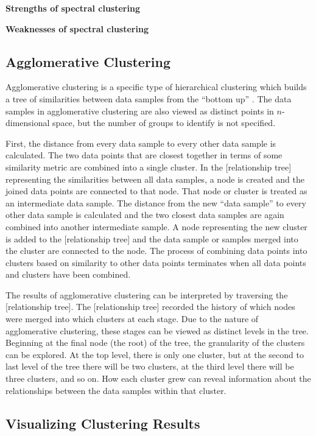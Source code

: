 \textbf{Strengths of spectral clustering}

\textbf{Weaknesses of spectral clustering}

\subsection{Agglomerative Clustering}

Agglomerative clustering is a specific type of hierarchical clustering which builds a tree of similarities between data samples from the ``bottom up'' \cite{Ward1963}. The data samples in agglomerative clustering are also viewed as distinct points in $n$-dimensional space, but the number of groups to identify is not specified. 

First, the distance from every data sample to every other data sample is calculated. The two data points that are closest together in terms of some similarity metric are combined into a single cluster. In the [relationship tree] representing the similarities between all data samples, a node is created and the joined data points are connected to that node. That node or cluster is treated as an intermediate data sample. The distance from the new ``data sample'' to every other data sample is calculated and the two closest data samples are again combined into another intermediate sample. A node representing the new cluster is added to the [relationship tree] and the data sample or samples merged into the cluster are connected to the node. The process of combining data points into clusters based on similarity to other data points terminates when all data points and clusters have been combined. 

The results of agglomerative clustering can be interpreted by traversing the [relationship tree]. The [relationship tree] recorded the history of which nodes were merged into which clusters at each stage. Due to the nature of agglomerative clustering, these stages can be viewed as distinct levels in the tree. Beginning at the final node (the root) of the tree, the granularity of the clusters can be explored. At the top level, there is only one cluster, but at the second to last level of the tree there will be two clusters, at the third level there will be three clusters, and so on. How each cluster grew can reveal information about the relationships between the data samples within that cluster.

\subsection{Visualizing Clustering Results} 

